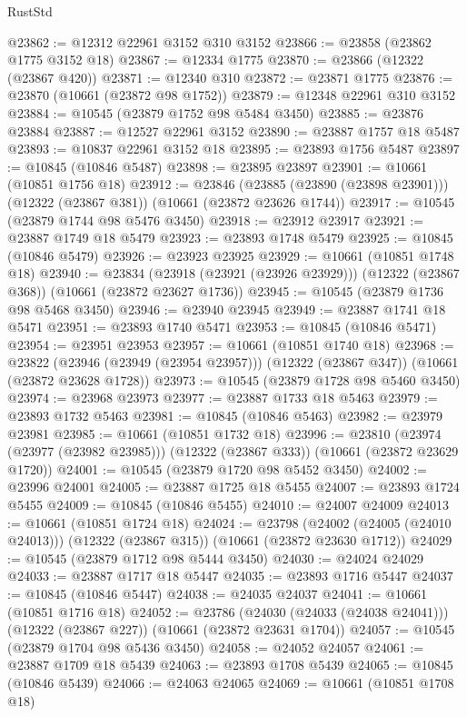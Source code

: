 \begin{lexlean}{RustStd}
\begin{coremodule}
@23862 := @12312 @22961 @3152 @310 @3152
@23866 := @23858 (@23862 @1775 @3152 @18)
@23867 := @12334 @1775
@23870 := @23866 (@12322 (@23867 @420))
@23871 := @12340 @310
@23872 := @23871 @1775
@23876 := @23870 (@10661 (@23872 @98 @1752))
@23879 := @12348 @22961 @310 @3152
@23884 := @10545 (@23879 @1752 @98 @5484 @3450)
@23885 := @23876 @23884
@23887 := @12527 @22961 @3152
@23890 := @23887 @1757 @18 @5487
@23893 := @10837 @22961 @3152 @18
@23895 := @23893 @1756 @5487
@23897 := @10845 (@10846 @5487)
@23898 := @23895 @23897
@23901 := @10661 (@10851 @1756 @18)
@23912 := @23846
    (@23885 (@23890 (@23898 @23901)))
    (@12322 (@23867 @381))
    (@10661 (@23872 @23626 @1744))
@23917 := @10545 (@23879 @1744 @98 @5476 @3450)
@23918 := @23912 @23917
@23921 := @23887 @1749 @18 @5479
@23923 := @23893 @1748 @5479
@23925 := @10845 (@10846 @5479)
@23926 := @23923 @23925
@23929 := @10661 (@10851 @1748 @18)
@23940 := @23834
    (@23918 (@23921 (@23926 @23929)))
    (@12322 (@23867 @368))
    (@10661 (@23872 @23627 @1736))
@23945 := @10545 (@23879 @1736 @98 @5468 @3450)
@23946 := @23940 @23945
@23949 := @23887 @1741 @18 @5471
@23951 := @23893 @1740 @5471
@23953 := @10845 (@10846 @5471)
@23954 := @23951 @23953
@23957 := @10661 (@10851 @1740 @18)
@23968 := @23822
    (@23946 (@23949 (@23954 @23957)))
    (@12322 (@23867 @347))
    (@10661 (@23872 @23628 @1728))
@23973 := @10545 (@23879 @1728 @98 @5460 @3450)
@23974 := @23968 @23973
@23977 := @23887 @1733 @18 @5463
@23979 := @23893 @1732 @5463
@23981 := @10845 (@10846 @5463)
@23982 := @23979 @23981
@23985 := @10661 (@10851 @1732 @18)
@23996 := @23810
    (@23974 (@23977 (@23982 @23985)))
    (@12322 (@23867 @333))
    (@10661 (@23872 @23629 @1720))
@24001 := @10545 (@23879 @1720 @98 @5452 @3450)
@24002 := @23996 @24001
@24005 := @23887 @1725 @18 @5455
@24007 := @23893 @1724 @5455
@24009 := @10845 (@10846 @5455)
@24010 := @24007 @24009
@24013 := @10661 (@10851 @1724 @18)
@24024 := @23798
    (@24002 (@24005 (@24010 @24013)))
    (@12322 (@23867 @315))
    (@10661 (@23872 @23630 @1712))
@24029 := @10545 (@23879 @1712 @98 @5444 @3450)
@24030 := @24024 @24029
@24033 := @23887 @1717 @18 @5447
@24035 := @23893 @1716 @5447
@24037 := @10845 (@10846 @5447)
@24038 := @24035 @24037
@24041 := @10661 (@10851 @1716 @18)
@24052 := @23786
    (@24030 (@24033 (@24038 @24041)))
    (@12322 (@23867 @227))
    (@10661 (@23872 @23631 @1704))
@24057 := @10545 (@23879 @1704 @98 @5436 @3450)
@24058 := @24052 @24057
@24061 := @23887 @1709 @18 @5439
@24063 := @23893 @1708 @5439
@24065 := @10845 (@10846 @5439)
@24066 := @24063 @24065
@24069 := @10661 (@10851 @1708 @18)

\end{coremodule}
\end{lexlean}
